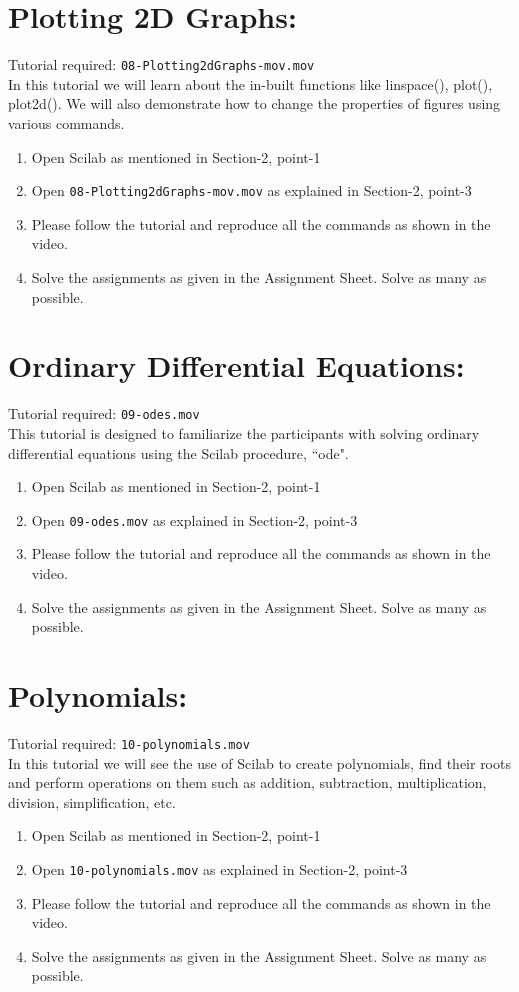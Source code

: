 \documentclass[11pt]{article}
\newenvironment{enumcpt}{\begin{enumerate} \topsep 0pt \partopsep 0pt 
                        \parsep 0pt
                        \itemsep 0pt \leftmargin -1in \rightmargin 0pt
                        }{\end{enumerate}}
\begin{document}
\begin{multicols}{2}
\section{Plotting 2D Graphs:}
Tutorial required: {\tt 08-Plotting2dGraphs-mov.mov} 
\\In this tutorial we will learn about the in-built functions like linspace(), plot(), plot2d(). We will also demonstrate how to change the properties of figures using various commands.
\begin{enumcpt}
\item Open Scilab as mentioned in Section-2, point-1
\item Open {\tt 08-Plotting2dGraphs-mov.mov} as explained in Section-2, point-3
\item Please follow the tutorial and reproduce all the commands as
  shown in the video.
\item Solve the assignments as given in the Assignment Sheet.  Solve as many as possible.
\end{enumcpt}

\section{Ordinary Differential Equations:}
Tutorial required: {\tt 09-odes.mov} \\ 
This tutorial is designed to familiarize the participants with solving ordinary differential equations using the Scilab procedure, ``ode".
\begin{enumcpt}
\item Open Scilab as mentioned in Section-2, point-1
\item Open {\tt 09-odes.mov} as explained in Section-2, point-3
\item Please follow the tutorial and reproduce all the commands as
  shown in the video.
\item Solve the assignments as given in the Assignment Sheet.  Solve as many as possible.
\end{enumcpt}

\section{Polynomials:}
Tutorial required: {\tt 10-polynomials.mov} \\ 
In this tutorial we will see the use of Scilab to create polynomials, find
their roots and perform operations on them such as addition, subtraction, multiplication, division, simplification, etc.
\begin{enumcpt}
\item Open Scilab as mentioned in Section-2, point-1
\item Open {\tt 10-polynomials.mov} as explained in Section-2, point-3
\item Please follow the tutorial and reproduce all the commands as
  shown in the video.
\item Solve the assignments as given in the Assignment Sheet.  Solve as many as possible.
\end{enumcpt}



\end{multicols}
\end{document}
